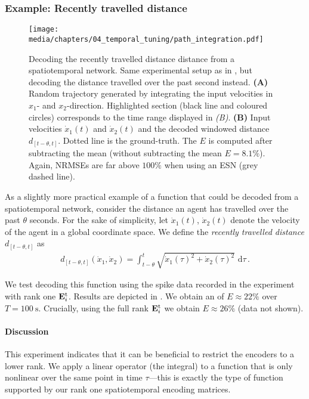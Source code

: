 \subsubsection{Example: Recently travelled distance}

\begin{figure}
	\texttt{[image: media/chapters/04\_temporal\_tuning/path\_integration.pdf]}
	\caption[Decoding the recently travelled distance distance from a spatiotemporal network]{Decoding the recently travelled distance distance from a spatiotemporal network. Same experimental setup as in , but decoding the distance travelled over the past second instead.
	\textbf{(A)} Random trajectory generated by integrating the input velocities in $x_1$- and $x_2$-direction.
	Highlighted section (black line and coloured circles) corresponds to the time range displayed in \emph{(B)}.
	\textbf{(B)} Input velocities $\dot x_1(t)$ and $\dot x_2(t)$ and the decoded windowed distance $d_{[t - \theta, t]}$.
	Dotted line is the ground-truth. The \NRMSE $E$ is computed after subtracting the mean (without subtracting the mean $E = 8.1\%$).
	Again, NRMSEs are far above $100\%$ when using an ESN (grey dashed line).
	}
	\label{fig:path_integration}
\end{figure}

As a slightly more practical example of a function that could be decoded from a spatiotemporal network, consider the distance an agent has travelled over the past $\theta$ seconds.
For the sake of simplicity, let $\dot x_1(t)$, $\dot x_2(t)$ denote the velocity of the agent in a global coordinate space.
We define the \emph{recently travelled distance} $d_{[t - \theta, t]}$ as
\begin{align*}
	d_{[t - \theta, t]}(\dot x_1, \dot x_2) = \int_{t - \theta}^t \sqrt{\dot x_1(\tau)^2 + \dot x_2(\tau)^2} \,\,\mathrm{d}\tau \,.
\end{align*}

We test decoding this function using the spike data recorded in the experiment with rank one $\mathbf{E}_i^\mathrm{t}$.
Results are depicted in .
We obtain an \NRMSE of $E \approx 22\%$ over $T = \SI{100}{\second}$.
Crucially, using the full rank $\mathbf{E}_i^\mathrm{t}$ we obtain $E \approx 26\%$ (data not shown).

\paragraph{Discussion}
This experiment indicates that it can be beneficial to restrict the encoders to a lower rank.
We apply a linear operator (the integral) to a function that is only nonlinear over the same point in time $\tau$---this is exactly the type of function supported by our rank one spatiotemporal encoding matrices.

